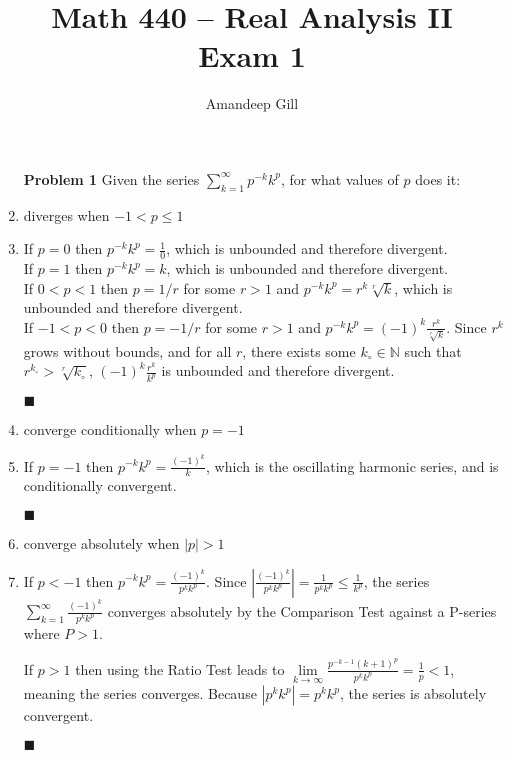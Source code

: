 \documentclass[a4paper,12pt]{report}
\newcommand{\bb}[1]{\mathbb{#1}}
\newcommand{\naught}[1]{{#1}_{\circ}}
\newcommand{\problem}[3]{
	\begin{enumerate}
		\item[\bf{Problem #1}] #2 
		#3
	\end{enumerate}
}
\newcommand{\subproof}[3]{
	\item[#1] #2
	\item[\bf{Proof:}] 
	#3 
	\begin{flushright}
		$\blacksquare$
	\end{flushright}
}
\begin{document}
\title{Math 440 -- Real Analysis II \\ \vspace{7px} \large{Exam 1}}
\author{Amandeep Gill}
\maketitle

\problem{1}{
	Given the series $\sum\limits_{k=1}^{\infty}p^{-k}k^p$, for what values of $p$ does it:
}{
	\subproof{(a)}{
		diverges when $-1 < p \leqslant 1$
	}{
		If $p = 0$ then $p^{-k}k^p = \frac{1}{0}$, which is unbounded and therefore divergent. \\
		If $p = 1$ then $p^{-k}k^p = k$, which is unbounded and therefore divergent. \\
		If $0 < p < 1$ then $p = 1/r$ for some $r > 1$ and $p^{-k}k^p = r^k \sqrt[r]{k}$, which is unbounded and therefore divergent. \\
		If $-1 < p < 0$ then $p = -1/r$ for some $r > 1$ and $p^{-k}k^p = (-1)^k \frac{r^k}{\sqrt[r]{k}}$. Since $r^k$ grows without bounds, and for all $r$, there exists some $\naught{k} \in \bb{N}$ such that $r^{\naught{k}} > \sqrt[r]{\naught{k}}$, $(-1)^{k}\frac{r^{k}}{k^p}$ is unbounded and therefore divergent.
	}
	
	\subproof{(b)}{
		converge conditionally when $p = -1$
	}{
		If $p = -1$ then $p^{-k}k^p = \frac{(-1)^k}{k}$, which is the oscillating harmonic series, and is conditionally convergent.
	}
	
	\subproof{(c)}{
		converge absolutely when $|p| > 1$
	}{
		If $p < -1$ then $p^{-k}k^p = \frac{(-1)^k}{p^k k^p}$. Since $\left|\frac{(-1)^k}{p^k k^p}\right| = \frac{1}{p^k k^p} \leqslant \frac{1}{k^p}$, the series $\sum\limits_{k=1}^{\infty}\frac{(-1)^k}{p^k k^p}$ converges absolutely by the Comparison Test against a P-series where $P > 1$.
		
		If $p > 1$ then using the Ratio Test leads to $\lim\limits_{k \to \infty}\frac{p^{-k-1}(k+1)^p}{p^k k^p} = \frac{1}{p} < 1$, meaning the series converges. Because $|p^k k^p| = p^k k^p$, the series is absolutely convergent.
	}
}

\pagebreak
\end{document}
